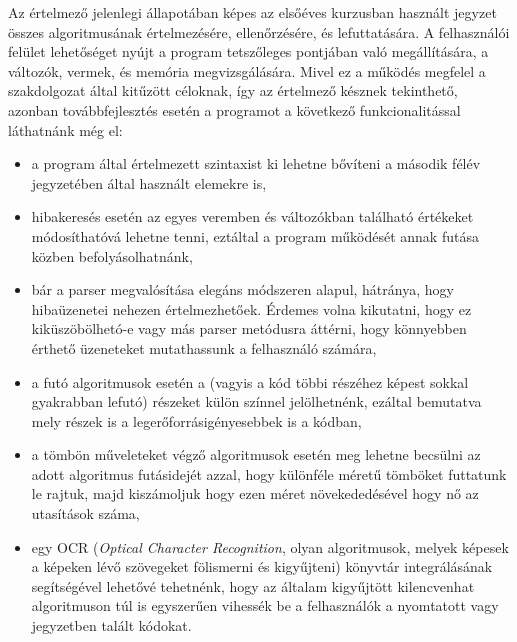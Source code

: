 Az értelmező jelenlegi állapotában képes az elsőéves kurzusban használt jegyzet\cite{jegyzet} összes algoritmusának értelmezésére, ellenőrzésére, és lefuttatására. A felhasználói felület lehetőséget nyújt a program tetszőleges pontjában való megállítására, a változók, vermek, és memória megvizsgálására. Mivel ez a működés megfelel a szakdolgozat által kitűzött céloknak, így az értelmező késznek tekinthető, azonban továbbfejlesztés esetén a programot a következő funkcionalitással láthatnánk még el:

\begin{itemize}
    \item a program által értelmezett szintaxist ki lehetne bővíteni a második félév jegyzetében által használt elemekre is,
    \item hibakeresés esetén az egyes veremben és változókban található értékeket módosíthatóvá lehetne tenni, eztáltal a program működését annak futása közben befolyásolhatnánk,
    \item bár a parser megvalósítása elegáns módszeren alapul, hátránya, hogy hibaüzenetei nehezen értelmezhetőek. Érdemes volna kikutatni, hogy ez kiküszöbölhetó-e vagy más parser metódusra áttérni, hogy könnyebben érthető üzeneteket mutathassunk a felhasználó számára,
    \item a futó algoritmusok esetén a  (vagyis a kód többi részéhez képest sokkal gyakrabban lefutó) részeket külön színnel jelölhetnénk, ezáltal bemutatva mely részek is a legerőforrásigényesebbek is a kódban,
    \item a tömbön műveleteket végző algoritmusok esetén meg lehetne becsülni az adott algoritmus futásidejét azzal, hogy különféle méretű tömböket futtatunk le rajtuk, majd kiszámoljuk hogy ezen méret növekededésével hogy nő az utasítások száma,
    \item egy OCR (\textit{Optical Character Recognition}, olyan algoritmusok, melyek képesek a képeken lévő szövegeket fölismerni és kigyűjteni) könyvtár integrálásának segítségével lehetővé tehetnénk, hogy az általam kigyűjtött kilencvenhat algoritmuson túl is egyszerűen vihessék be a felhasználók a nyomtatott vagy jegyzetben talált kódokat.
\end{itemize}